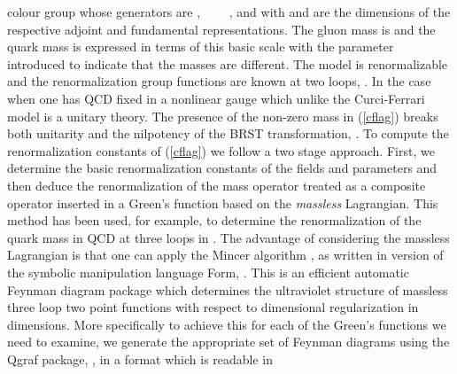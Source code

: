 \documentclass[a4paper,11pt]{article}
\providecommand{\Nf}{N_{\!f}}
\begin{document}
colour group whose generators are \coordHE{}, \coordHE{}~\myHighlight{$\leq$}\coordHE{}~\coordHE{}~\myHighlight{$\leq$}\coordHE{}~\coordHE{}, 
\coordHE{}  \myHighlight{$\leq$}\coordHE{}  \coordHE{}  \myHighlight{$\leq$}\coordHE{}  \coordHE{} and \coordHE{}  \myHighlight{$\leq$}\coordHE{}  \coordHE{}  \myHighlight{$\leq$}\coordHE{}  \myHighlight{$\Nf$}\coordHE{} with \coordHE{} and 
\coordHE{} are the dimensions of the respective adjoint and fundamental 
representations. The gluon mass is \coordHE{} and the quark mass is expressed in terms
of this basic scale with the parameter \myHighlight{$\beta$}\coordHE{} introduced to indicate that the 
masses are different. The model is renormalizable and the renormalization group
functions are known at two loops, \cite{28,29}. In the case when \coordHE{}  \myHighlight{$=$}\coordHE{}  \coordHE{} 
one has QCD fixed in a nonlinear gauge which unlike the Curci-Ferrari model is 
a unitary theory. The presence of the non-zero mass in (\ref{cflag}) breaks 
both unitarity and the nilpotency of the BRST transformation, 
\cite{18,19,20,21,22,23,24,25}. To compute the renormalization constants of 
(\ref{cflag}) we follow a two stage approach. First, we determine the basic 
renormalization constants of the fields and parameters and then deduce the 
renormalization of the mass operator treated as a composite operator inserted 
in a Green's function based on the {\em massless} Lagrangian. This method has 
been used, for example, to determine the renormalization of the quark mass in 
QCD at three loops in \cite{30,31}. The advantage of considering the massless 
Lagrangian is that one can apply the {\sc Mincer} algorithm \cite{32}, as 
written in version \coordHE{} of the symbolic manipulation language {\sc Form}, 
\cite{33,34}. This is an efficient automatic Feynman diagram package which 
determines the ultraviolet structure of massless three loop two point functions
with respect to dimensional regularization in \coordHE{}  \myHighlight{$=$}\coordHE{}  \coordHE{}  \myHighlight{$-$}\coordHE{}  \myHighlight{$2\epsilon$}\coordHE{} 
dimensions. More specifically to achieve this for each of the Green's functions
we need to examine, we generate the appropriate set of Feynman diagrams using 
the {\sc Qgraf} package, \cite{35}, in a format which is readable in 
\end{document}
